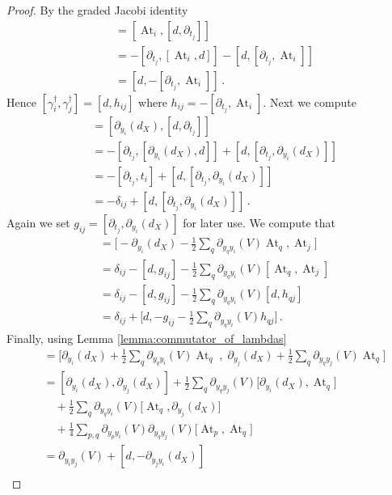 \documentclass[english,letter paper,12pt,leqno]{article}
\theoremstyle{example}
\numberwithin{equation}{section}
\DeclareMathOperator{\At}{At}
\begin{document}
\begin{proof}
By the graded Jacobi identity
\begin{align*}
[\At_i, \At_j] &= [\At_i, [d, \partial_{t_j}]]\\
&= - [\partial_{t_j}, [\At_i, d]] - [d, [\partial_{t_j}, \At_i]]\\
&= [d, -[\partial_{t_j}, \At_i]]\,.
\end{align*}
Hence $[\gamma_i^\dagger, \gamma_j^\dagger] = [d, h_{ij}]$ where $h_{ij} = - [ \partial_{t_j}, \At_i ]$. Next we compute
\begin{align*}
[\partial_{y_i}(d_X), \At_j] &= [\partial_{y_i}(d_X), [d, \partial_{t_j}]]\\
&= -[\partial_{t_j}, [\partial_{y_i}(d_X), d]] + [d, [\partial_{t_j}, \partial_{y_i}(d_X)]]\\
&= -[\partial_{t_j}, t_i] + [d, [\partial_{t_j}, \partial_{y_i}(d_X)]]\\
&= -\delta_{ij} + [d, [\partial_{t_j}, \partial_{y_i}(d_X)]]\,.
\end{align*}
Again we set $g_{ij} = [\partial_{t_j}, \partial_{y_i}(d_X)]$ for later use. We compute that
\begin{align*}
[ \gamma_i, \gamma^\dagger_j] &= \big[- \partial_{y_i}(d_X) - \frac{1}{2} \sum_q \partial_{y_q y_i}(V) \At_{q}, \At_j \big]\\
&= \delta_{ij} - [d, g_{ij}] - \frac{1}{2} \sum_q \partial_{y_qy_i}(V) [ \At_q, \At_j]\\
&= \delta_{ij} - [d, g_{ij}] - \frac{1}{2} \sum_q \partial_{y_qy_i}(V) [d, h_{qj}]\\
&= \delta_{ij} + \big[d, -g_{ij} - \frac{1}{2} \sum_q \partial_{y_qy_i}(V) h_{qj}\big]\,.
\end{align*}
Finally, using Lemma \ref{lemma:commutator_of_lambdas}
\begin{align*}
[ \gamma_i, \gamma_j ] &= \Big[ \partial_{y_i}(d_X) + \frac{1}{2} \sum_q \partial_{y_q y_i}(V) \At_{q}\; , \; \partial_{y_j}(d_X) + \frac{1}{2} \sum_q \partial_{y_q y_j}(V) \At_{q} \Big]\\
&= [ \partial_{y_i}(d_X), \partial_{y_j}(d_X) ] + \frac{1}{2}\sum_q \partial_{y_qy_j}(V) \big[ \partial_{y_i}(d_X), \At_q \big]\\
&\quad + \frac{1}{2}\sum_q \partial_{y_q y_i}(V) \big[ \At_q, \partial_{y_j}(d_X) \big]\\
&\quad + \frac{1}{4}\sum_{p,q} \partial_{y_py_i}(V) \partial_{y_qy_j}(V) \big[ \At_p, \At_q \big]\\
&= \partial_{y_iy_j}(V) + [d, - \partial_{y_jy_i}(d_X)]\\

\end{align*}
\end{proof}
\end{document}
